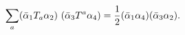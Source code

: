 \begin{equation}\label{polyglo}
\sum_a  (\bar \alpha_1 T_a \alpha_2)\,\, (\bar \alpha_3 T^a
\alpha_4)={1\over 2}(\bar \alpha_1\alpha_4) (\bar \alpha_3
\alpha_2).
\end{equation}


